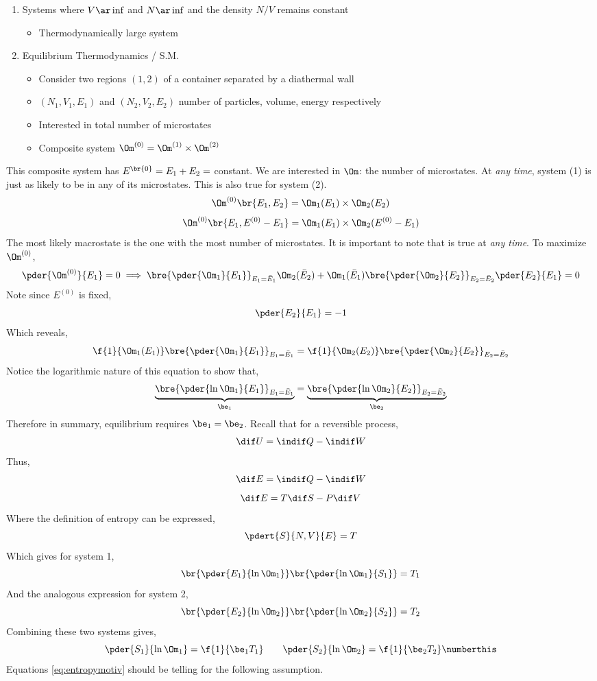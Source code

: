 \documentclass{article}
\begin{document}
\begin{enumerate}
    \item Systems where $V \ar \inf$ and $N \ar \inf$ and the density $N/V$ remains constant
    \begin{itemize}
        \item Thermodynamically large system
    \end{itemize}
    \item Equilibrium Thermodynamics / S.M.
    \begin{itemize}
        \item Consider two regions $(1,2)$ of a container separated by a diathermal wall
        \item $(N_1, V_1, E_1)$ and $(N_2, V_2, E_2)$ number of particles, volume, energy respectively
        \item Interested in total number of microstates
        \item Composite system $\Om^{(0)} = \Om^{(1)} \times \Om^{(2)}$
    \end{itemize}
\end{enumerate}
This composite system has $E^{\br{0}} = E_1 + E_2 = $ constant. We are interested in $\Om$: the number of microstates. At \textit{any time}, system (1) is just as likely to be in any of its microstates. This is also true for system (2).
\[ \Om^{(0)}\br{E_1, E_2} = \Om_1(E_1) \times \Om_2(E_2) \]
\[ \Om^{(0)}\br{E_1, E^{(0)} - E_1} = \Om_1(E_1) \times \Om_2(E^{(0)} - E_1) \]
The most likely macrostate is the one with the most number of microstates. It is important to note that is true at \textit{any time}. To maximize $\Om^{(0)}$,
\[ \pder{\Om^{(0)}}{E_1} = 0 \implies \bre{\pder{\Om_1}{E_1}}_{E_1 = \bar{E}_1} \Om_2(\bar{E}_2) + \Om_1(\bar{E}_1) \bre{\pder{\Om_2}{E_2}}_{E_2 = \bar{E}_2} \pder{E_2}{E_1} = 0 \]
Note since $E^{(0)}$ is fixed,
\[ \pder{E_2}{E_1} = -1 \]
Which reveals,
\[ \f{1}{\Om_1(E_1)} \bre{\pder{\Om_1}{E_1}}_{E_1 = \bar{E}_1} = \f{1}{\Om_2(E_2)} \bre{\pder{\Om_2}{E_2}}_{E_2 = \bar{E}_2} \]
Notice the logarithmic nature of this equation to show that,
\[ \underbrace{\bre{\pder{\ln\Om_1}{E_1}}_{E_1 = \bar{E}_1}}_{\be_1} = \underbrace{\bre{\pder{\ln\Om_2}{E_2}}_{E_2 = \bar{E}_2}}_{\be_2} \]
Therefore in summary, equilibrium requires $\be_1 = \be_2$. Recall that for a reversible process,
\[ \dif U = \indif Q - \indif W \]
Thus,
\[ \dif E = \indif Q - \indif W \]
\[ \dif E = T \dif S - P \dif V \]
Where the definition of entropy can be expressed,
\[ \pdert{S}{N,V}{E} = T \]
Which gives for system 1,
\[ \br{\pder{E_1}{\ln\Om_1}} \br{\pder{\ln\Om_1}{S_1}} = T_1 \]
And the analogous expression for system 2,
\[ \br{\pder{E_2}{\ln\Om_2}} \br{\pder{\ln\Om_2}{S_2}} = T_2 \]
Combining these two systems gives,
\[ \pder{S_1}{\ln\Om_1} = \f{1}{\be_1T_1} \qquad \pder{S_2}{\ln\Om_2} = \f{1}{\be_2T_2} \numberthis \label{eq:entropymotiv}\]
Equations \eqref{eq:entropymotiv} should be telling for the following assumption. \\
\end{document}
